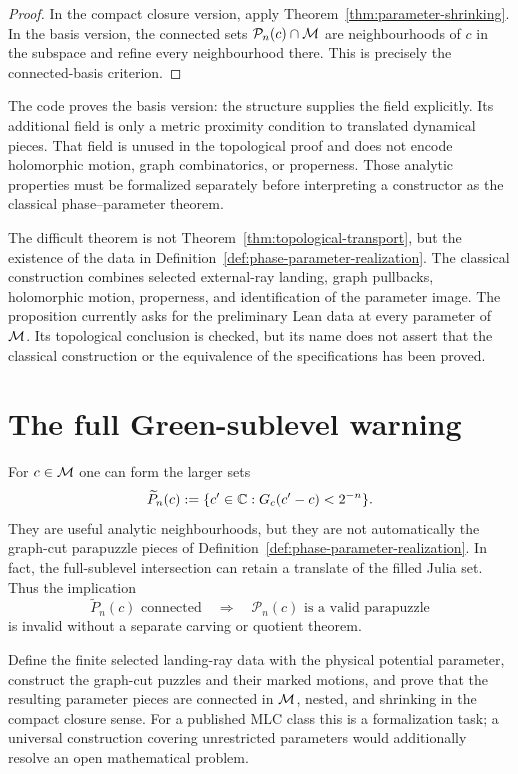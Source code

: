 \begin{proof}
In the compact closure version, apply
Theorem~\ref{thm:parameter-shrinking}.  In the basis version, the
connected sets $\mathcal P_n(c)\cap\mathcal M$ are neighbourhoods of $c$ in
the subspace and refine every neighbourhood there.  This is precisely
the connected-basis criterion.
\end{proof}

The code
proves the basis version: the structure supplies the field
 explicitly.
Its additional  field is only a
metric proximity condition to translated dynamical pieces.  That field
is unused in the topological proof and does not encode holomorphic
motion, graph combinatorics, or properness.  Those analytic properties
must be formalized separately before interpreting a constructor as the
classical phase--parameter theorem.

\begin{conditionalstep}
The difficult theorem is not Theorem~\ref{thm:topological-transport}, but
the existence of the data in Definition~\ref{def:phase-parameter-realization}.
The classical construction combines selected external-ray landing,
graph pullbacks, holomorphic motion, properness, and identification of
the parameter image.  The proposition
 currently asks for the preliminary
Lean data at every parameter of $\mathcal M$.  Its topological conclusion is
checked, but its name does not assert that the classical construction
or the equivalence of the specifications has been proved.
\end{conditionalstep}

\section{The full Green-sublevel warning}

For $c\in\mathcal M$ one can form the larger sets
\[
 \widetilde P_n(c):=
 \{c'\in\mathbb C:G_c(c'-c)<2^{-n}\}.
\]
They are useful analytic neighbourhoods, but they are not automatically
the graph-cut parapuzzle pieces of Definition~\ref{def:phase-parameter-realization}.
In fact, the full-sublevel intersection can retain a translate of the
filled Julia set.  Thus the implication
\[
 \widetilde P_n(c)\text{ connected}
 \quad\Longrightarrow\quad
 \mathcal P_n(c)\text{ is a valid parapuzzle}
\]
is invalid without a separate carving or quotient theorem.

\begin{formalobligation}
\label{est:phase-parameter}
Define the finite selected landing-ray data with the physical potential
parameter, construct the graph-cut puzzles and their marked motions, and
prove that the resulting parameter pieces are connected in $\mathcal M$,
nested, and shrinking in the compact closure sense.  For a published
MLC class this is a formalization task; a universal construction
covering unrestricted parameters would additionally resolve an open
mathematical problem.
\end{formalobligation}
